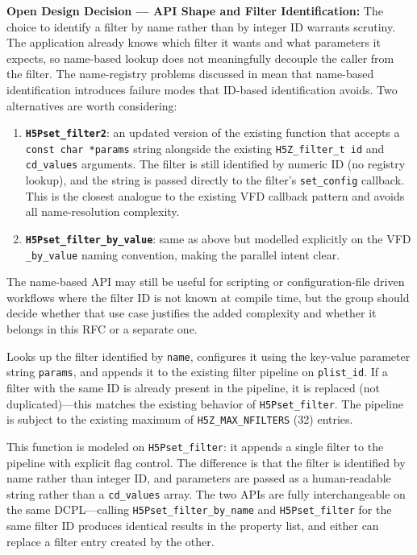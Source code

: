 \documentclass[../HDF5_RFC.tex]{subfiles}
\begin{document}
\noindent\colorbox{yellow!25}{\parbox{\dimexpr\linewidth-2\fboxsep}{%
  \textbf{Open Design Decision --- API Shape and Filter Identification:}
  The choice to identify a filter by name rather than by integer ID warrants
  scrutiny.  The application already knows which filter it wants and what
  parameters it expects, so name-based lookup does not meaningfully decouple
  the caller from the filter.  The name-registry problems discussed in
   mean that name-based identification
  introduces failure modes that ID-based identification avoids.
  Two alternatives are worth considering:
  \begin{enumerate}
    \item \textbf{\texttt{H5Pset\_filter2}}: an updated version of the existing
          function that accepts a \texttt{const char~*params} string alongside
          the existing \texttt{H5Z\_filter\_t id} and \texttt{cd\_values} arguments.
          The filter is still identified by numeric ID (no registry lookup),
          and the string is passed directly to the filter's \texttt{set\_config}
          callback.  This is the closest analogue to the existing VFD callback
          pattern and avoids all name-resolution complexity.
    \item \textbf{\texttt{H5Pset\_filter\_by\_value}}: same as above but modelled
          explicitly on the VFD \texttt{\_by\_value} naming convention, making
          the parallel intent clear.
  \end{enumerate}
  The name-based API may still be useful for scripting or configuration-file
  driven workflows where the filter ID is not known at compile time, but the
  group should decide whether that use case justifies the added complexity and
  whether it belongs in this RFC or a separate one.
}}

Looks up the filter identified by \texttt{name}, configures it using
the key-value parameter string \texttt{params}, and appends it to the existing filter
pipeline on \texttt{plist\_id}. If a filter with the same ID is already present in the
pipeline, it is replaced (not duplicated)---this matches the existing
behavior of \texttt{H5Pset\_filter}. The pipeline is subject to the existing maximum
of \texttt{H5Z\_MAX\_NFILTERS} (32) entries.

This function is modeled on \texttt{H5Pset\_filter}: it appends a single filter to
the pipeline with explicit flag control. The difference is that the filter is
identified by name rather than integer ID, and parameters are passed as a
human-readable string rather than a \texttt{cd\_values} array. The two APIs are fully
interchangeable on the same DCPL---calling \texttt{H5Pset\_filter\_by\_name} and
\texttt{H5Pset\_filter} for the same filter ID produces identical results in the
property list, and either can replace a filter entry created by the other.
\end{document}
